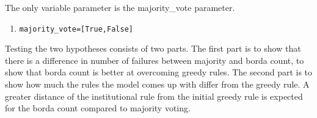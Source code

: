 \documentclass[a4paper]{article}
\begin{document}
The only variable parameter is the majority\_vote parameter.
\begin{enumerate}
 \item  \begin{alltt} majority_vote = [True, False] \end{alltt}
\end{enumerate}


Testing the two hypotheses consists of two parts. The first part is to show that there 
is a difference in number of failures between majority and borda count, to show that
borda count is better at overcoming greedy rules. The second part is to show how much the rules
the model comes up with differ from the greedy rule. A greater distance of the institutional rule 
from the initial greedy rule is expected for the borda count compared to majority voting. 
\end{document}

